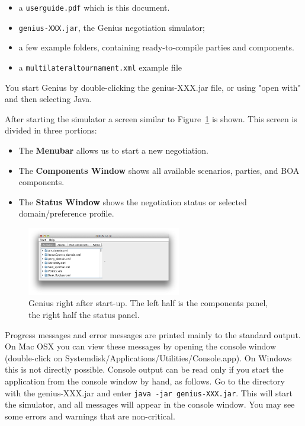 \documentclass[]{article}
\newcommand\Genius{{\sc Genius}}
\begin{document}
\begin{itemize}
	\item a  \texttt{userguide.pdf} which is this document.
	\item \texttt{genius-XXX.jar}, the {\Genius} negotiation simulator;
	\item a few example folders, containing ready-to-compile parties and components.
	\item a \texttt{multilateraltournament.xml} example file
\end{itemize}

You start {\Genius} by double-clicking the genius-XXX.jar file, or using "open with" and then selecting Java. 

 After starting the simulator a screen similar to Figure~\ref{Fig:negosimulator start} is shown. This screen is divided in three portions:

\begin{itemize}
	\item The \textbf{Menubar} allows us to start a new negotiation.
	\item The \textbf{Components Window} shows all available scenarios, parties, and BOA components.
	\item The \textbf{Status Window} shows the negotiation status or selected domain/preference profile.
\end{itemize}

\begin{figure}[htb]
	\centering
	\includegraphics[width=0.6\textwidth]{media/start.png}
\caption{{\Genius} right after start-up. The left half is the components panel, the right half the status panel.}\label{Fig:negosimulator start}
\end{figure}


Progress messages and error messages are printed mainly to the standard output. On Mac OSX you can view these messages by opening the console window (double-click on Systemdisk/Applications/Utilities/Console.app). On Windows this is not directly possible. Console output can be read only if you start the application from the console window by hand, as follows. Go to the directory with the genius-XXX.jar and enter
\texttt{java -jar genius-XXX.jar}.
This will start the simulator, and all messages will appear in the console window. You may see some errors and warnings that are non-critical.
\end{document}
